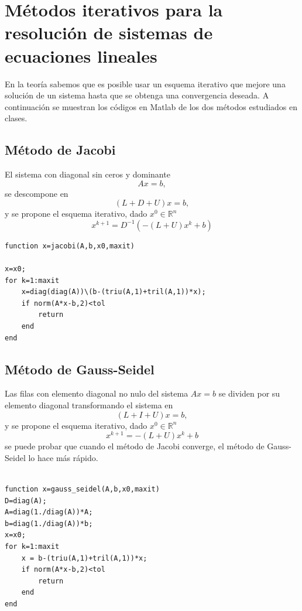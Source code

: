 \documentclass[12pt,letterpaper]{article}
\begin{document}
\section{M\'etodos iterativos para la resoluci\'on de sistemas de ecuaciones lineales}                                                         
En la teor\'ia sabemos que es posible usar un esquema iterativo que mejore una soluci\'on de un sistema hasta que se obtenga una convergencia deseada. A continuaci\'on se muestran los c\'odigos en Matlab de los dos m\'etodos estudiados en clases.
\subsection{M\'etodo de Jacobi}
El sistema con diagonal sin ceros y dominante
$$
Ax=b,
$$
se descompone en 
$$
(L+D+U)x=b,
$$
y se propone el esquema iterativo, dado $x^0\in\mathbb{R}^n$
$$
x^{k+1}=D^{-1}(-(L+U)x^k+b)
$$
\begin{verbatim}
function x=jacobi(A,b,x0,maxit)

x=x0;
for k=1:maxit
    x=diag(diag(A))\(b-(triu(A,1)+tril(A,1))*x);
    if norm(A*x-b,2)<tol
        return
    end
end
\end{verbatim}

\subsection{M\'etodo de Gauss-Seidel}
Las filas con elemento diagonal no nulo del sistema  $Ax=b$ se dividen por su elemento diagonal transformando el sistema en
$$
(L+I+U)x=b,
$$
y se propone el esquema iterativo, dado $x^0\in\mathbb{R}^n$
$$
x^{k+1}=-(L+U)x^k+b
$$
se puede probar que cuando el m\'etodo de Jacobi converge, el m\'etodo de Gauss-Seidel lo hace m\'as r\'apido.
\begin{verbatim}

function x=gauss_seidel(A,b,x0,maxit)
D=diag(A);
A=diag(1./diag(A))*A;
b=diag(1./diag(A))*b;
x=x0;
for k=1:maxit
    x = b-(triu(A,1)+tril(A,1))*x;
    if norm(A*x-b,2)<tol
        return
    end
end
\end{verbatim}
\end{document}
